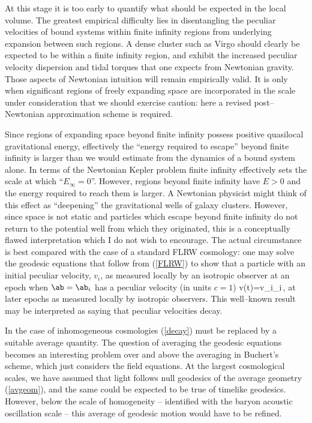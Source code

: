 \documentclass[12pt]{iopart}
\begin{document}
At this stage it is too early to quantify what should be expected in the
local volume. The greatest empirical difficulty lies in disentangling the
peculiar velocities of bound systems within finite infinity regions from
underlying expansion between such regions. A dense cluster such as
Virgo should clearly be expected to be within a finite infinity region,
and exhibit the increased peculiar velocity dispersion and tidal torques
that one expects from Newtonian gravity. Those aspects of Newtonian
intuition will remain empirically valid. It is only when significant
regions of freely expanding space are incorporated in the scale under
consideration that we should exercise caution: here a revised
post--Newtonian approximation scheme is required.

Since regions of expanding space beyond finite infinity possess positive
quasilocal gravitational energy, effectively the ``energy required to escape''
beyond finite infinity is larger than we would estimate from the dynamics
of a bound system alone. In terms of the Newtonian Kepler problem finite
infinity effectively sets the scale at which ``$E_\infty=0$''. However,
regions beyond finite infinity have $E>0$ and the energy required to reach
them is larger. A Newtonian physicist might think of this effect as
``deepening'' the gravitational wells of galaxy clusters. However, since
space is not static and particles which escape beyond finite infinity do
not return to the potential well from which they originated,
this is a conceptually flawed interpretation which I do
not wish to encourage. The actual circumstance is best compared with the
case of a standard FLRW cosmology: one may solve the geodesic equations
that follow from (\ref{FLRW}) to show that a particle with an initial peculiar
velocity, $v_i$, as measured locally by an isotropic observer at an epoch
when $\ab=\ab_i$ has a peculiar velocity (in units $c=1$)
\beq v(t)={v_i\ab_i\over{}}\,,
\label{decay}\eeq
at later epochs as measured locally by isotropic observers. This well--known
result may be interpreted as saying that peculiar velocities decay.

In the case of inhomogeneous cosmologies (\ref{decay}) must be replaced by a
suitable average quantity. The question of averaging the geodesic equations
becomes an interesting problem over and above the averaging in Buchert's
scheme, which just considers the field equations. At the largest cosmological
scales, we have assumed that light follows null geodesics of the average
geometry (\ref{avgeom}), and the same could be expected to be true of
timelike geodesics. However, below the scale of homogeneity -- identified
with the baryon acoustic oscillation scale -- this average of geodesic
motion would have to be refined.
\end{document}
